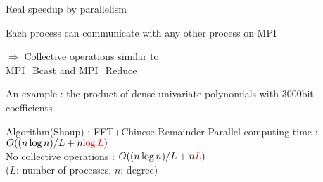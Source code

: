 \documentclass{slides}
\begin{document}
\parskip 3pt

{\color {red} Real speedup by parallelism}

Each process can communicate with any other process on {\color{green} MPI}

$\Rightarrow$ {\color{green} Collective operations} similar to \\
{\color{SeaGreen} MPI\_Bcast} and {\color{SeaGreen} MPI\_Reduce}

\vskip 8pt

{\color{red} An example} :
the product of dense univariate polynomials with 3000bit coefficients

\vskip 8pt
{\color{green} Algorithm}(Shoup) : FFT+Chinese Remainder
\vskip 5pt
{\color{green} Parallel computing time} : $O((n\log n)/L+n{\color{red}\log L})$\\
No collective operations : $O((n\log n)/L+n{\color{red}L})$\\
($L$: number of processes, $n$: degree)

\vskip 8pt

\epsfxsize=17cm
\rightline{ {\color{red} {\tt http://www.openxm.org} }}
\end{document}
